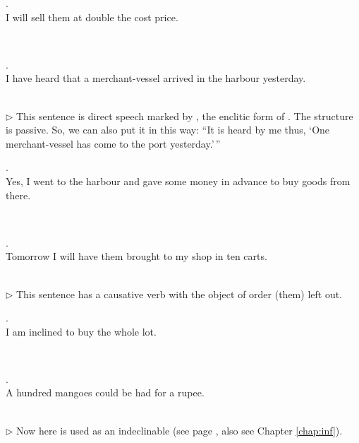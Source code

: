 \medskip
\parbox[lt]{0.93\linewidth}{\raggedright{}. \\
\hspace*{6mm}I will sell them at double the cost price.}\\[1mm]

\medskip
\parbox[lt]{0.93\linewidth}{\raggedright{}. \\
\hspace*{6mm}I have heard that a merchant-vessel arrived in the harbour yesterday.}\\[1mm]
{\small $\triangleright$ This sentence is direct speech marked by , the enclitic form of . The structure is passive. So, we can also put it in this way: ``It is heard by me thus, `One merchant-vessel has come to the port yesterday.'\,''}

\medskip
\parbox[lt]{0.93\linewidth}{\raggedright{}. \\
\hspace*{6mm}Yes, I went to the harbour and gave some money in advance to buy goods from there.}\\[1mm]

\medskip
\parbox[lt]{0.93\linewidth}{\raggedright{}. \\
\hspace*{6mm}Tomorrow I will have them brought to my shop in ten carts.}\\[1mm]
{\small $\triangleright$ This sentence has a causative verb with the object of order (them) left out.}

\medskip
\parbox[lt]{0.93\linewidth}{\raggedright{}. \\
\hspace*{6mm}I am inclined to buy the whole lot.}\\[1mm]

\medskip
\parbox[lt]{0.93\linewidth}{\raggedright{}. \\
\hspace*{6mm}A hundred mangoes could be had for a rupee.}\\[1mm]
{\small $\triangleright$ Now here  is used as an indeclinable (see page \pageref{nip:sakkaa}, also see Chapter \ref{chap:inf}).}

